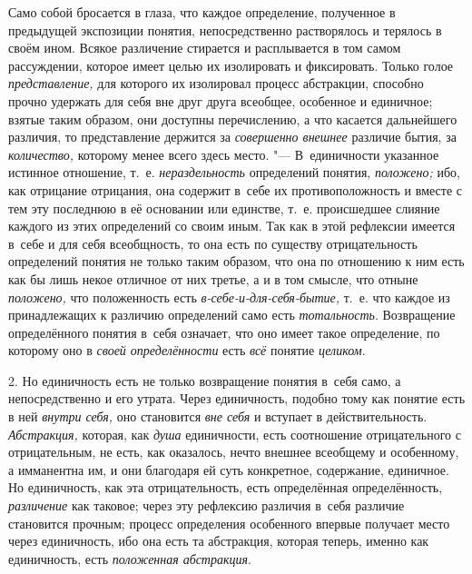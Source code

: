 Само собой бросается в глаза, что каждое определение,
полученное в предыдущей экспозиции понятия, непосредственно растворялось и
терялось в своём ином. Всякое различение стирается и расплывается в том
самом рассуждении, которое имеет целью их изолировать и фиксировать. Только
голое {\em представление,}
для которого их изолировал процесс абстракции, способно
прочно удержать для себя вне друг друга всеобщее, особенное и единичное;
взятые таким образом, они доступны перечислению, а что касается дальнейшего
различия, то представление держится за {\em совершенно внешнее}
различие бытия, за {\em количество,} которому менее всего здесь
место. "--- В~единичности указанное истинное отношение, т.~е.
{\em нераздельность} определений понятия, {\em положено;} ибо, как
отрицание отрицания, она содержит в~себе их противоположность и вместе с
тем эту последнюю в её основании или единстве, т.~е. происшедшее слияние
каждого из этих определений со своим иным. Так как в этой рефлексии
имеется в~себе и для себя всеобщность, то она есть по существу
отрицательность определений понятия не только таким образом, что она по
отношению к ним есть как бы лишь некое отличное от них третье, а и в том
смысле, что отныне {\em положено,} что положенность есть
{\em в-себе-и-для-себя-бытие,} т.~е. что каждое из принадлежащих к различию
определений само есть {\em тотальность}. Возвращение определённого понятия
в~себя означает, что оно имеет такое определение, по которому оно в
{\em своей определённости} есть {\em всё} понятие {\em целиком}.

2. Но единичность есть не только возвращение понятия в~себя
само, а непосредственно и его утрата. Через единичность, подобно тому как
понятие есть в ней {\em внутри себя,} оно
становится {\em вне себя} и вступает в действительность.
{\em Абстракция,} которая, как {\em душа}
единичности, есть соотношение отрицательного с отрицательным,
не есть, как оказалось, нечто внешнее всеобщему и особенному, а имманентна
им, и они благодаря ей суть конкретное, содержание, единичное. Но
единичность, как эта отрицательность, есть определённая определённость,
{\em различение} как таковое; через эту рефлексию различия в~себя различие
становится прочным; процесс определения особенного впервые получает место через
единичность, ибо она есть та абстракция, которая теперь, именно как
единичность, есть {\em положенная абстракция}.

